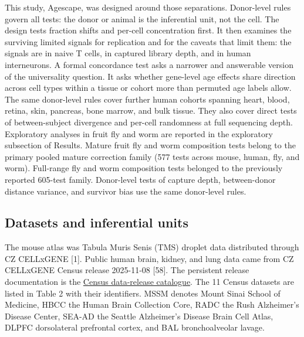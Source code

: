 \documentclass[11pt]{article}
\begin{document}
This study, Agescape, was designed around those separations. Donor-level rules govern all tests: the donor or animal is the inferential unit, not the cell. The design tests fraction shifts and per-cell concentration first. It then examines the surviving limited signals for replication and for the caveats that limit them: the signals are in naive T cells, in captured library depth, and in human interneurons. A formal concordance test asks a narrower and answerable version of the universality question. It asks whether gene-level age effects share direction across cell types within a tissue or cohort more than permuted age labels allow. The same donor-level rules cover further human cohorts spanning heart, blood, retina, skin, pancreas, bone marrow, and bulk tissue. They also cover direct tests of between-subject divergence and per-cell randomness at full sequencing depth. Exploratory analyses in fruit fly and worm are reported in the exploratory subsection of Results. Mature fruit fly and worm composition tests belong to the primary pooled mature correction family (577 tests across mouse, human, fly, and worm). Full-range fly and worm composition tests belonged to the previously reported 605-test family. Donor-level tests of capture depth, between-donor distance variance, and survivor bias use the same donor-level rules.

\subsection*{Datasets and inferential units}

The mouse atlas was Tabula Muris Senis (TMS) droplet data distributed through CZ CELLxGENE [1]. Public human brain, kidney, and lung data came from CZ CELLxGENE Census release 2025-11-08 [58]. The persistent release documentation is the \href{https://chanzuckerberg.github.io/cellxgene-census/cellxgene_census_docsite_data_release_info.html}{Census data-release catalogue}. The 11 Census datasets are listed in Table 2 with their identifiers. MSSM denotes Mount Sinai School of Medicine, HBCC the Human Brain Collection Core, RADC the Rush Alzheimer's Disease Center, SEA-AD the Seattle Alzheimer's Disease Brain Cell Atlas, DLPFC dorsolateral prefrontal cortex, and BAL bronchoalveolar lavage.
\end{document}

